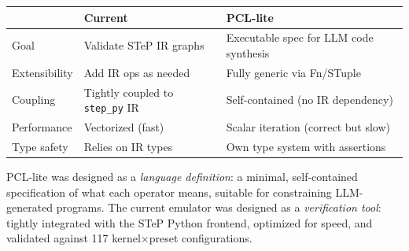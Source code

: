 \documentclass[11pt]{article}
\begin{document}
\begin{center}
\begin{tabular}{lll}
\toprule
& \textbf{Current} & \textbf{PCL-lite} \\
\midrule
Goal        & Validate STeP IR graphs & Executable spec for LLM code synthesis \\
Extensibility & Add IR ops as needed   & Fully generic via Fn/STuple \\
Coupling    & Tightly coupled to \texttt{step\_py} IR & Self-contained (no IR dependency) \\
Performance & Vectorized (fast)       & Scalar iteration (correct but slow) \\
Type safety & Relies on IR types      & Own type system with assertions \\
\bottomrule
\end{tabular}
\end{center}

PCL-lite was designed as a \emph{language definition}: a minimal, self-contained specification of what each operator means, suitable for constraining LLM-generated programs.
The current emulator was designed as a \emph{verification tool}: tightly integrated with the STeP Python frontend, optimized for speed, and validated against 117 kernel$\times$preset configurations.
\end{document}
